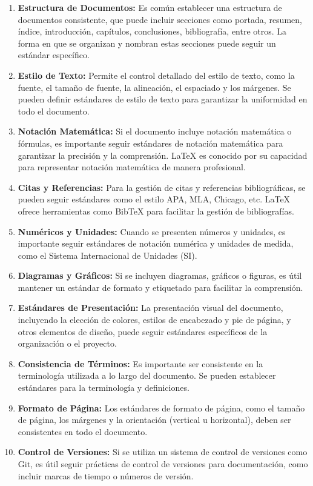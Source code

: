 \documentclass[letterpaper]{article}
\begin{document}
\begin{enumerate}[series=listWWNumxviii,label=\arabic*.,ref=\arabic*]
\item \textbf{Estructura de Documentos:} Es común establecer una estructura de documentos consistente, que puede incluir
secciones como portada, resumen, índice, introducción, capítulos, conclusiones, bibliografía, entre otros. La forma en
que se organizan y nombran estas secciones puede seguir un estándar específico.
\item \textbf{Estilo de Texto:} Permite el control detallado del estilo de texto, como la fuente, el tamaño de fuente,
la alineación, el espaciado y los márgenes. Se pueden definir estándares de estilo de texto para garantizar la
uniformidad en todo el documento.
\item \textbf{Notación Matemática:} Si el documento incluye notación matemática o fórmulas, es importante seguir
estándares de notación matemática para garantizar la precisión y la comprensión. LaTeX es conocido por su capacidad
para representar notación matemática de manera profesional.
\item \textbf{Citas y Referencias:} Para la gestión de citas y referencias bibliográficas, se pueden seguir estándares
como el estilo APA, MLA, Chicago, etc. LaTeX ofrece herramientas como BibTeX para facilitar la gestión de
bibliografías.
\item \textbf{Numéricos y Unidades:} Cuando se presenten números y unidades, es importante seguir estándares de notación
numérica y unidades de medida, como el Sistema Internacional de Unidades (SI).
\item \textbf{Diagramas y Gráficos:} Si se incluyen diagramas, gráficos o figuras, es útil mantener un estándar de
formato y etiquetado para facilitar la comprensión.
\item \textbf{Estándares de Presentación:} La presentación visual del documento, incluyendo la elección de colores,
estilos de encabezado y pie de página, y otros elementos de diseño, puede seguir estándares específicos de la
organización o el proyecto.
\item \textbf{Consistencia de Términos:} Es importante ser consistente en la terminología utilizada a lo largo del
documento. Se pueden establecer estándares para la terminología y definiciones.
\item \textbf{Formato de Página:} Los estándares de formato de página, como el tamaño de página, los márgenes y la
orientación (vertical u horizontal), deben ser consistentes en todo el documento.
\item \textbf{Control de Versiones:} Si se utiliza un sistema de control de versiones como Git, es útil seguir prácticas
de control de versiones para documentación, como incluir marcas de tiempo o números de versión.
\end{enumerate}
\end{document}
